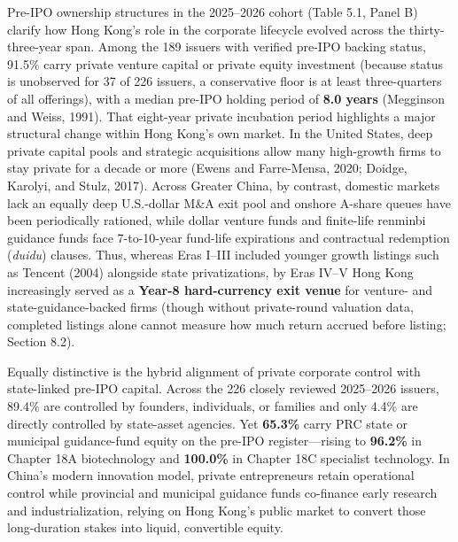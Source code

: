 \documentclass[11pt,letterpaper]{article}
\begin{document}
Pre-IPO ownership structures in the 2025–2026 cohort (Table 5.1, Panel B) clarify how Hong Kong's role in the corporate lifecycle evolved across the thirty-three-year span. Among the 189 issuers with verified pre-IPO backing status, 91.5\% carry private venture capital or private equity investment (because status is unobserved for 37 of 226 issuers, a conservative floor is at least three-quarters of all offerings), with a median pre-IPO holding period of \textbf{8.0 years} (Megginson and Weiss, 1991). That eight-year private incubation period highlights a major structural change within Hong Kong's own market. In the United States, deep private capital pools and strategic acquisitions allow many high-growth firms to stay private for a decade or more (Ewens and Farre-Mensa, 2020; Doidge, Karolyi, and Stulz, 2017). Across Greater China, by contrast, domestic markets lack an equally deep U.S.-dollar M\&A exit pool and onshore A-share queues have been periodically rationed, while dollar venture funds and finite-life renminbi guidance funds face 7-to-10-year fund-life expirations and contractual redemption (\textit{duidu}) clauses. Thus, whereas Eras I–III included younger growth listings such as Tencent (2004) alongside state privatizations, by Eras IV–V Hong Kong increasingly served as a \textbf{Year-8 hard-currency exit venue} for venture- and state-guidance-backed firms (though without private-round valuation data, completed listings alone cannot measure how much return accrued before listing; Section 8.2).

Equally distinctive is the hybrid alignment of private corporate control with state-linked pre-IPO capital. Across the 226 closely reviewed 2025–2026 issuers, 89.4\% are controlled by founders, individuals, or families and only 4.4\% are directly controlled by state-asset agencies. Yet \textbf{65.3\%} carry PRC state or municipal guidance-fund equity on the pre-IPO register—rising to \textbf{96.2\%} in Chapter 18A biotechnology and \textbf{100.0\%} in Chapter 18C specialist technology. In China's modern innovation model, private entrepreneurs retain operational control while provincial and municipal guidance funds co-finance early research and industrialization, relying on Hong Kong's public market to convert those long-duration stakes into liquid, convertible equity.
\end{document}
